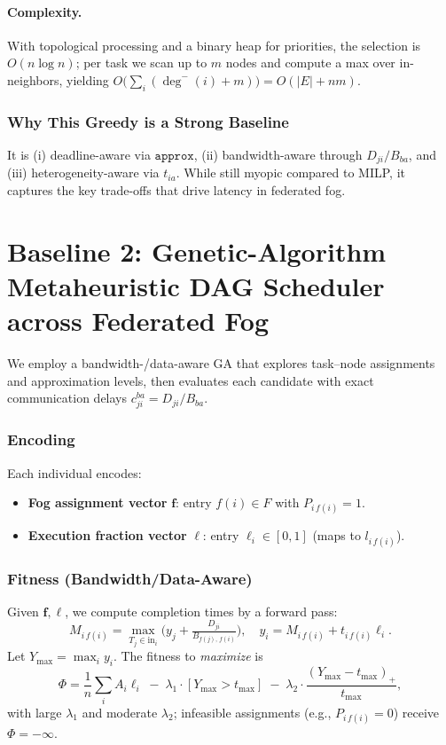\documentclass[conference]{IEEEtran}
\begin{document}
\paragraph{Complexity.} With topological processing and a binary heap for priorities, the selection is \(O(n\log n)\); per task we scan up to \(m\) nodes and compute a max over in-neighbors, yielding \(O\!\big(\sum_i (\deg^-(i)+m)\big)=O(|E|+nm)\).

\subsubsection{Why This Greedy is a Strong Baseline}
It is (i) deadline-aware via \(\texttt{approx}\), (ii) bandwidth-aware through \(D_{ji}/B_{ba}\), and (iii) heterogeneity-aware via \(t_{ia}\). While still myopic compared to MILP, it captures the key trade-offs that drive latency in federated fog.

\section{Baseline 2: Genetic-Algorithm Metaheuristic DAG Scheduler across Federated Fog}
\label{sec:baseline-ga}

We employ a bandwidth-/data-aware GA that explores task--node assignments and approximation levels, then evaluates each candidate with exact communication delays \(c_{ji}^{ba}=D_{ji}/B_{ba}\).

\subsubsection{Encoding}
Each individual encodes:
\begin{itemize}
    \item \textbf{Fog assignment vector} \(\mathbf{f}\): entry \(f(i)\in F\) with \(P_{i\,f(i)}=1\).
    \item \textbf{Execution fraction vector} \(\boldsymbol{\ell}\): entry \(\ell_i\in[0,1]\) (maps to \(l_{i\,f(i)}\)).
\end{itemize}

\subsubsection{Fitness (Bandwidth/Data-Aware)}
Given \(\mathbf{f},\boldsymbol{\ell}\), we compute completion times by a forward pass:
\[
M_{i\,f(i)}=\max_{T_j\in \text{in}_i}\!\Big(y_j+\tfrac{D_{ji}}{B_{f(j),\,f(i)}}\Big),\quad
y_i=M_{i\,f(i)}+t_{i\,f(i)}\ell_i.
\]
Let \(Y_{\max}=\max_i y_i\). The fitness to \emph{maximize} is
\[
\Phi=\frac{1}{n}\sum_i A_i \ell_i\;-\;\lambda_1\!\cdot\![Y_{\max}>t_{\max}]\;-\;\lambda_2\!\cdot\!\frac{(Y_{\max}-t_{\max})_+}{t_{\max}},
\]
with large \(\lambda_1\) and moderate \(\lambda_2\); infeasible assignments (e.g., \(P_{i\,f(i)}=0\)) receive \(\Phi=-\infty\).
\end{document}
